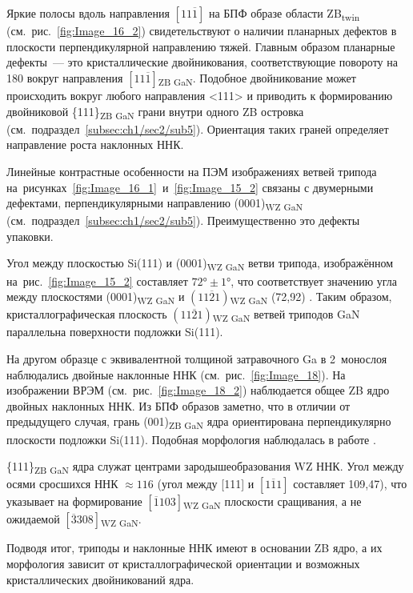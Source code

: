 Яркие полосы вдоль направления \([11\overline{1}]\) на БПФ образе области
ZB\textsubscript{twin} (см.~рис.~\cref{fig:Image_16_2}) свидетельствуют о
наличии планарных дефектов в плоскости перпендикулярной направлению тяжей.
Главным образом планарные дефекты~--- это кристаллические двойникования,
соответствующие повороту на 180{\textdegree} вокруг направления
\([11\overline{1}]\)\textsubscript{ZB GaN}. Подобное двойникование может
происходить вокруг любого направления <111> \cite{Suturin2017} и приводить к
формированию двойниковой \{111\}\textsubscript{ZB GaN} грани внутри одного ZB
островка (см.~подраздел~\cref{subsec:ch1/sec2/sub5}). Ориентация таких граней
определяет направление роста наклонных ННК.

Линейные контрастные особенности на ПЭМ изображениях ветвей трипода
на~рисунках~\cref{fig:Image_16_1}~и~\cref{fig:Image_15_2} связаны с двумерными
дефектами, перпендикулярными направлению (0001)\textsubscript{WZ GaN}
(см.~подраздел~\cref{subsec:ch1/sec2/sub5}). Преимущественно это дефекты
упаковки.

Угол между плоскостью Si(111) и (0001)\textsubscript{WZ GaN} ветви трипода,
изображённом на~рис.~\cref{fig:Image_15_2} составляет \(72\si{\degree} \pm
1\si{\degree}\), что соответствует значению угла между плоскостями
(0001)\textsubscript{WZ GaN} и \((11\overline{2}1)\)\textsubscript{WZ GaN}
(72,92\textdegree) \cite{Wang2016}. Таким образом, кристаллографическая
плоскость \((11\overline{2}1)\)\textsubscript{WZ GaN} ветвей триподов GaN
параллельна поверхности подложки Si(111).

На другом образце с эквивалентной толщиной затравочного Ga в 2~монослоя
наблюдались двойные наклонные ННК (см.~рис.~\cref{fig:Image_18}). На
изображении ВРЭМ (см.~рис.~\cref{fig:Image_18_2}) наблюдается общее ZB ядро
двойных наклонных ННК. Из БПФ образов заметно, что в отличии от предыдущего
случая, грань (001)\textsubscript{ZB GaN} ядра ориентирована перпендикулярно
плоскости подложки Si(111). Подобная морфология наблюдалась в работе
\cite{Wang2017}.

\{111\}\textsubscript{ZB GaN} ядра служат центрами зародышеобразования WZ ННК.
Угол между осями сросшихся ННК \(\approx 116\){\textdegree} (угол между [111] и
\([\overline{111}]\) составляет 109,47\textdegree), что указывает на
формирование \([\overline{1}103]\)\textsubscript{WZ GaN} плоскости сращивания,
а не ожидаемой \([\overline{3}308]\)\textsubscript{WZ GaN}.

Подводя итог, триподы и наклонные ННК имеют в основании ZB ядро, а их
морфология зависит от кристаллографической ориентации и возможных
кристаллических двойникований ядра.

